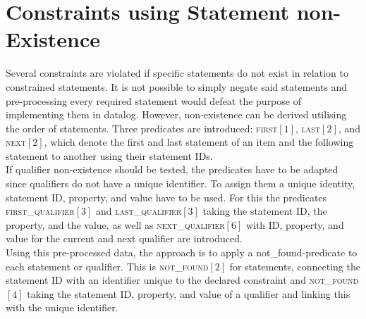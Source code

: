 \documentclass[hyperref,bachelorofscience,fleqn]{cgvpub}
\begin{document}
\section{Constraints using Statement non-Existence}\label{sec_constraints_using_statement_non}
Several constraints are violated if specific statements do not exist in relation to constrained statements. It is not possible to simply negate said statements and pre-processing every required statement would defeat the purpose of implementing them in datalog. However, non-existence can be derived utilising the order of statements. Three predicates are introduced: \textsc{first}\([1]\), \textsc{last}\([2]\), and \textsc{next}\([2]\), which denote the first and last statement of an item and the following statement to another using their statement IDs.\\

If qualifier non-existence should be tested, the predicates have to be adapted since qualifiers do not have a unique identifier. To assign them a unique identity, statement ID, property, and value have to be used. For this the predicates \textsc{first\_qualifier}\([3]\) and \textsc{last\_qualifier}\([3]\) taking the statement ID, the property, and the value, as well as \textsc{next\_qualifier}\([6]\) with ID, property, and value for the current and next qualifier are introduced.\\

Using this pre-processed data, the approach is to apply a not\_found-predicate to each statement or qualifier. This is \textsc{not\_found}\([2]\) for statements, connecting the statement ID with an identifier unique to the declared constraint and \textsc{not\_found}\([4]\) taking the statement ID, property, and value of a qualifier and linking this with the unique identifier.\\
\end{document}
